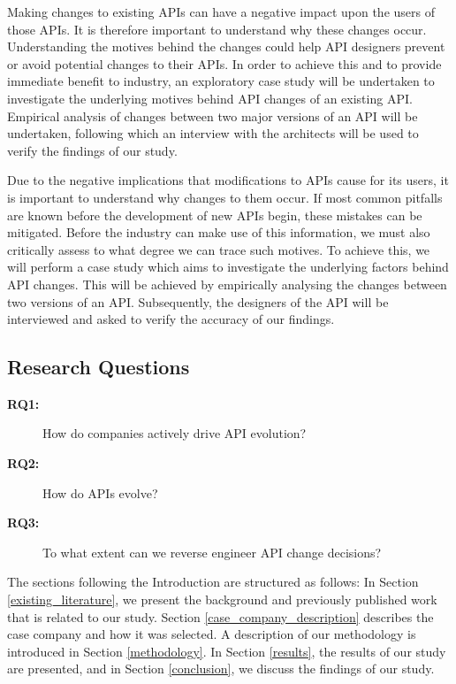 \documentclass[conference]{IEEEtran}
\begin{document}
Making changes to existing APIs can have a negative impact upon the users of those APIs. It is therefore important to understand why these changes occur. Understanding the motives behind the changes could help API designers prevent or avoid potential changes to their APIs. In order to achieve this and to provide immediate benefit to industry, an exploratory case study will be undertaken to investigate the underlying motives behind API changes of an existing API. Empirical analysis of changes between two major versions of an API will be undertaken, following which an interview with the architects will be used to verify the findings of our study. 

Due to the negative implications that modifications to APIs cause for its users, it is important to understand why changes to them occur. If most common pitfalls are known before the development of new APIs begin, these mistakes can be mitigated. Before the industry can make use of this information, we must also critically assess to what degree we can trace such motives. To achieve this, we will perform a case study which aims to investigate the underlying factors behind API changes. This will be achieved by empirically analysing the changes between two versions of an API. Subsequently, the designers of the API will be interviewed and asked to verify the accuracy of our findings. 


\subsection{Research Questions} \label{rqs}
\begin{description}
\item[\textbf{RQ1:}] How do companies actively drive API evolution?
\item[\textbf{RQ2:}] How do APIs evolve?
\item[\textbf{RQ3:}] To what extent can we reverse engineer API change decisions?


\end{description}

The sections following the Introduction are structured as follows: In Section \ref{existing_literature}, we present the background and previously published work that is related to our study. Section \ref{case_company_description} describes the case company and how it was selected. A description of our methodology is introduced in Section \ref{methodology}. In Section \ref{results}, the results of our study are presented, and in Section \ref{conclusion}, we discuss the findings of our study.
\end{document}
